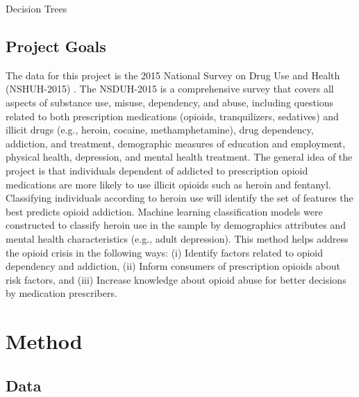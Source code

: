 \documentclass[sigconf]{acmart}
\begin{document}
Decision Trees




\subsection{Project Goals} 

The data for this project is the 2015 National Survey on Drug Use and Health 
(NSHUH-2015) \cite{samhsa16}. The NSDUH-2015 is a comprehensive survey that 
covers all aspects of substance use, misuse, dependency, and abuse, including 
questions related to both prescription medications (opioids, tranquilizers, 
sedatives) and illicit drugs (e.g., heroin, cocaine, methamphetamine), drug 
dependency, addiction, and treatment, demographic measures of education and 
employment, physical health, depression, and mental health treatment. The 
general idea of the project is that individuals dependent of addicted to 
prescription opioid medications are more likely to use illicit opioids such 
as heroin and fentanyl. Classifying individuals according to heroin use will 
identify the set of features the best predicts opioid addiction. Machine 
learning classification models were constructed to classify heroin use 
in the sample by demographics attributes and mental health characteristics 
(e.g., adult depression). This method helps address the opioid crisis in 
the following ways: (i) Identify factors related to opioid dependency and addiction, (ii) Inform consumers of prescription opioids about risk factors, 
and (iii) Increase knowledge about opioid abuse for better decisions by 
medication prescribers. 




\section{Method}

\subsection{Data} 
\end{document}

